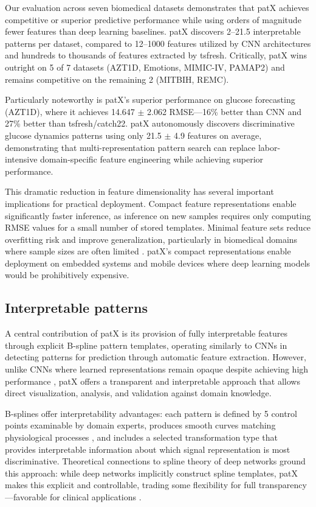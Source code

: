 \documentclass[11pt]{article}
\begin{document}
Our evaluation across seven biomedical datasets demonstrates that patX achieves
competitive or superior predictive performance while using orders of magnitude
fewer features than deep learning baselines.
patX discovers 2--21.5 interpretable patterns per dataset, compared to 12--1000
features utilized by CNN architectures and hundreds to thousands of features
extracted by tsfresh.
Critically, patX wins outright on 5 of 7 datasets (AZT1D, Emotions, MIMIC-IV,
PAMAP2) and remains competitive on the remaining 2 (MITBIH, REMC).

Particularly noteworthy is patX's superior performance on glucose forecasting
(AZT1D), where it achieves 14.647 $\pm$ 2.062 RMSE---16\% better than CNN and
27\% better than tsfresh/catch22.
patX autonomously discovers discriminative glucose dynamics patterns using only
21.5 $\pm$ 4.9 features on average, demonstrating that multi-representation pattern search
can replace labor-intensive domain-specific feature engineering while achieving
superior performance.

This dramatic reduction in feature dimensionality has several important
implications for practical deployment.
Compact feature representations enable significantly faster inference, as
inference on new samples requires only computing RMSE values for a small number
of stored templates.
Minimal feature sets reduce overfitting risk and improve generalization,
particularly in biomedical domains where sample sizes are often limited
\cite{guyon2003introduction}.
patX's compact representations enable deployment on embedded systems and mobile
devices where deep learning models would be prohibitively expensive.

\subsection{Interpretable patterns}

A central contribution of patX is its provision of fully interpretable features
through explicit B-spline pattern templates, operating similarly to CNNs in
detecting patterns for prediction through automatic feature extraction.
However, unlike CNNs where learned representations remain opaque despite
achieving high performance \cite{miotto2018deep, ennab2024enhancing}, patX
offers a transparent and interpretable approach that allows direct visualization,
analysis, and validation against domain knowledge.

B-splines offer interpretability advantages: each pattern is defined by 5
control points examinable by domain experts, produces smooth
curves matching physiological processes \cite{unser1999splines}, and includes
a selected transformation type that provides interpretable information about
which signal representation is most discriminative.
Theoretical connections to spline theory of deep networks
\cite{balestriero2018spline} ground this approach: while deep networks
implicitly construct spline templates, patX makes this explicit and
controllable, trading some flexibility for full transparency---favorable for
clinical applications \cite{tonekaboni2019clinicians}.
\end{document}
